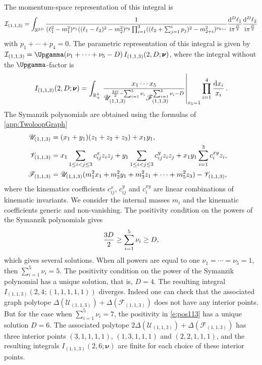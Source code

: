 \documentclass[12pt,a4paper]{article}
\theoremstyle{plain}
\theoremstyle{remark}
\newcommand{\dd}{\mathrm{d}}
\newcommand{\cU}{\mathscr {U}}
\newcommand{\cF}{\mathscr {F}}
\newcommand{\cV}{\mathscr {V}}
\newcommand{\undernotation}[1]{\pmb{#1}}
\newcommand{\ii}{\mathrm{i}}
\newcommand{\Newton}{\Delta}
\begin{document}
		 The momentum-space representation of this integral is
		\begin{equation}
		\mathcal{I}_{(1,1,3)}=\int_{\mathbb R^{2D}}\frac{1 }
			{		(\ell_1^2-m_{1}^2)^{\nu_1} ((\ell_1-\ell_2)^2-m_{2}^2)^{\nu_2}\prod_{i=1}^3
				(    (\ell_2+\sum_{j=1}^i p_j)^2-m_{2+i}^2)^{\nu_{2+i} }  }
			\frac{\dd^{D}\ell_1}{\ii \pi^{D\over 2}}	\frac{\dd^{D}\ell_2}{\ii \pi^{D\over2}}	
		\end{equation}
		with $p_1+\cdots+p_4=0$.
		The parametric representation of this integral is given by $\mathcal I_{(1,1,3)}=\Upgamma(\nu_1+\cdots+\nu_5-D)
		\,  I_{(1,1,3)}(2,D;\undernotation{\nu})$, where the integral without the $\Upgamma$-factor is
		\begin{equation}\label{e:I11n}
			 I_{(1,1,3)}(2,D;\undernotation{\nu})=
			\int_{\mathbb R_+^{4}} \left. x_1\cdots x_{5}\over
				\cU_{(1,1,3)}^{{3D\over2}-\sum_{i=1}^5\nu_i}\cF_{(1,1,3)}^{\sum_{i=1}^5\nu_i-D}\right|_{x_{5}=1}
                              \prod_{i=1}^{4}{\dd x_i\over x_i}\,.
		\end{equation}
        The Symanzik polynomials are obtained using the formulas of \cref{app:TwoloopGraph}
        \begin{align}
            \cU_{(1,1,3)}&=(x_1+y_1)(z_1+z_2+z_3)+x_1y_1,\cr
            \cV_{(1,1,3)}&=x_1 \sum_{1\leq i<j\leq 3} c_{ij}^x z_iz_j+y_1 \sum_{1\leq i<j\leq 3} c_{ij}^y z_iz_j+x_1y_1\sum_{i=1}^3 c_i^{xy} z_i ,\cr
            \cF_{(1,1,3)}&=\cU_{(1,1,3)}(m_1^2x_1+m_2^2y_1+m_3^2z_1+\cdots +m_5^2z_3)-\cV_{(1,1,3)},
        \end{align}
        where the kinematics coefficients  $c^x_{ij}$, $c^y_{ij}$ and $c^{xy}_i$ are linear combinations of kinematic invariants. We consider the internal masses $m_i$ and the kinematic coefficients generic and non-vanishing. 
		The positivity condition on the powers of the Symanzik
                polynomials gives
                \begin{equation}\label{e:pos113}
                {3D\over2}\geq \sum_{i=1}^5\nu_i\geq D,
                \end{equation}
                which
                gives several solutions. 
                When all powers are equal to one $\nu_1=\cdots=\nu_5=1$, then  $\sum_{i=1}^5\nu_i=5$. The positivity condition on the power of the Symanzik polynomial has a unique solution, that is, $D=4$. The resulting integral $I_{(1,1,3)}(2,4;(1,1,1,1,1))$ 
        diverges. Indeed one can check that the associated graph polytope $\Newton(\cU_{(1,1,3)})+\Newton(\cF_{(1,1,3)})$ does not have any interior points.
        But for the case when $\sum_{i=1}^5\nu_i=7$, the positivity in \cref{e:pos113} has a unique solution $D=6$.  The associated  polytope $2\Newton(\cU_{(1,1,3)})+\Newton(\cF_{(1,1,3)})$ has three interior points $(3,1,1,1,1)$, $(1,3,1,1,1)$ and $(2,2,1,1,1)$, and the resulting integrals $I_{(1,1,3)}(2,6;\undernotation{\nu})$ are finite for each choice of these interior points.  
        
\end{document}
